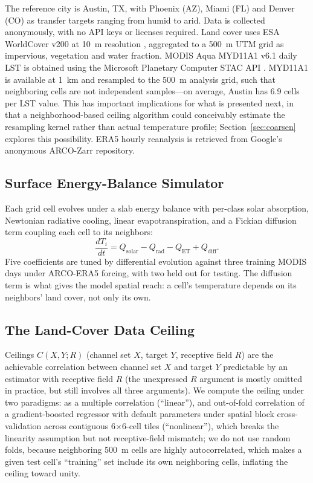 The reference city is Austin, TX, with Phoenix (AZ), Miami (FL) and Denver (CO) as transfer targets ranging from humid to arid. Data is collected anonymously, with no API keys or licenses required. Land cover uses ESA WorldCover v200 at 10~m resolution \cite{zanaga2022esa}, aggregated to a 500~m UTM grid as impervious, vegetation and water fraction. MODIS Aqua MYD11A1 v6.1 daily LST is obtained using the Microsoft Planetary Computer STAC API \cite{microsoft_pc}. MYD11A1 is available at 1~km and resampled to the 500~m analysis grid, such that neighboring cells are not independent samples---on average, Austin has 6.9 cells per LST value. This has important implications for what is presented next, in that a neighborhood-based ceiling algorithm could conceivably estimate the resampling kernel rather than actual temperature profile; Section~\ref{sec:coarsen} explores this possibility. ERA5 hourly reanalysis \cite{hersbach2020era5} is retrieved from Google's anonymous ARCO-Zarr repository.

\subsection{Surface Energy-Balance Simulator}

Each grid cell evolves under a slab energy balance with per-class solar
absorption, Newtonian radiative cooling, linear evapotranspiration, and a
Fickian diffusion term coupling each cell to its neighbors:
\begin{equation}
\frac{dT_i}{dt} = Q_{\mathrm{solar}} - Q_{\mathrm{rad}} - Q_{\mathrm{ET}} + Q_{\mathrm{diff}}.
\end{equation}
Five coefficients are tuned by differential evolution
\cite{storn1997differential} against three training MODIS days under
ARCO-ERA5 forcing, with two held out for testing. The diffusion term is
what gives the model spatial reach: a cell's temperature depends on its
neighbors' land cover, not only its own.

\subsection{The Land-Cover Data Ceiling}

Ceilings $C(X,Y;R)$ (channel set $X$, target $Y$, receptive field $R$) are the achievable correlation between channel set $X$ and target $Y$ predictable by an estimator with receptive field $R$ (the unexpressed $R$ argument is mostly omitted in practice, but still involves all three arguments). We compute the ceiling under two paradigms: as a multiple correlation
(``linear''), and out-of-fold correlation of a gradient-boosted regressor \cite{friedman2001greedy} with default parameters under spatial block cross-validation across contiguous 6$\times$6-cell tiles (``nonlinear''), which breaks the linearity assumption but not receptive-field mismatch; we do not use random folds, because neighboring 500~m cells are highly autocorrelated, which makes a given test cell's ``training'' set include its own neighboring cells, inflating the ceiling toward unity.

